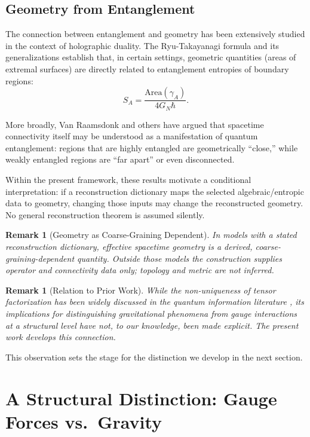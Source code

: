 \documentclass[12pt,a4paper]{article}
\newtheorem{remark}[theorem]{Remark}
\begin{document}
\subsection{Geometry from Entanglement}

The connection between entanglement and geometry has been extensively studied in the context of holographic duality. The Ryu-Takayanagi formula \cite{RyuTakayanagi2006} and its generalizations establish that, in certain settings, geometric quantities (areas of extremal surfaces) are directly related to entanglement entropies of boundary regions:
\begin{equation}
S_A = \frac{\text{Area}(\gamma_A)}{4 G_N \hbar}.
\end{equation}

More broadly, Van Raamsdonk \cite{VanRaamsdonk2010} and others have argued that spacetime connectivity itself may be understood as a manifestation of quantum entanglement: regions that are highly entangled are geometrically ``close,'' while weakly entangled regions are ``far apart'' or even disconnected.

Within the present framework, these results motivate a conditional interpretation: if a reconstruction dictionary maps the selected algebraic/entropic data to geometry, changing those inputs may change the reconstructed geometry.  No general reconstruction theorem is assumed silently.

\begin{remark}[Geometry as Coarse-Graining Dependent]
In models with a stated reconstruction dictionary, effective spacetime geometry is a derived, coarse-graining-dependent quantity.  Outside those models the construction supplies operator and connectivity data only; topology and metric are not inferred.
\end{remark}

\begin{remark}[Relation to Prior Work]
While the non-uniqueness of tensor factorization has been widely discussed in the quantum information literature \cite{Zanardi2001,Zanardi2004}, its implications for distinguishing gravitational phenomena from gauge interactions at a structural level have not, to our knowledge, been made explicit. The present work develops this connection.
\end{remark}

This observation sets the stage for the distinction we develop in the next section.

\section{A Structural Distinction: Gauge Forces vs.\ Gravity}
\label{sec:distinction}
\end{document}
